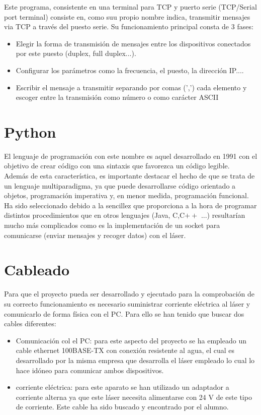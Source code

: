 Este programa, consistente en una terminal para TCP y puerto serie (TCP/Serial port terminal) consiste en, como suu propio nombre indica, transmitir mensajes via TCP a través del puesto serie. Su funcionamiento principal consta de 3 fases:
\begin{itemize}
	\item Elegir la forma de transmisión de mensajes entre los dispositivos conectados por este puesto (duplex, full duplex...).
	\item Configurar los parámetros como la frecuencia, el puesto, la dirección IP....
	\item Escribir el mensaje a transmitir separando por comas (',') cada elemento y escoger entre la transmisión como número o como carácter ASCII
\end{itemize}

\section{Python}

El lenguaje de programación con este nombre es aquel desarrollado en 1991 con el objetivo de crear código con una sintaxis que favorezca un código legible.\\
Además de esta característica, es importante destacar el hecho de que se trata de un lenguaje multiparadigma, ya que puede desarrollarse código orientado a objetos, programación imperativa y, en menor medida, programación funcional. \\
Ha sido seleccionado debido a la sencillez que proporciona a la hora de programar distintos procedimientos que en otros lenguajes (Java, C,C$ ++$ ...) resultarían mucho más complicados como es la implementación de un socket para comunicarse (enviar mensajes y recoger datos) con el láser.

\section{Cableado}

Para que el proyecto pueda ser desarrollado y ejecutado para la comprobación de su correcto funcionamiento es necesario suministrar corriente eléctrica al láser y comunicarlo de forma física con el PC. Para ello se han tenido que buscar dos cables diferentes:
\begin{itemize}
	\item Comunicación col el PC: para este aspecto del proyecto se ha empleado un cable ethernet 100BASE-TX con conexión resistente al agua, el cual es desarrollado por la misma empresa que desarrolla el láser empleado lo cual lo hace idóneo para comunicar ambos dispositivos.\\
	\item corriente eléctrica: para este aparato se han utilizado un adaptador a corriente alterna ya que este láser necesita alimentarse con 24 V de este tipo de corriente. Este cable ha sido buscado y encontrado por el alumno.
\end{itemize}